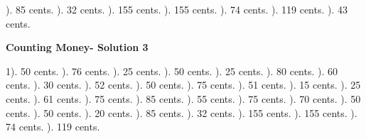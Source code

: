 \documentclass{article}%
\begin{document}
). 85 cents.%
). 32 cents.%
). 155 cents.%
). 155 cents.%
). 74 cents.%
). 119 cents.%
). 43 cents.%
\newline%
\newpage%
\large%
\begin{center}%
\textbf{Counting Money- Solution 3}%
\newline%
\end{center} \normalsize%
1). 50 cents.%
). 76 cents.%
). 25 cents.%
). 50 cents.%
). 25 cents.%
). 80 cents.%
). 60 cents.%
). 30 cents.%
). 52 cents.%
). 50 cents.%
). 75 cents.%
). 51 cents.%
). 15 cents.%
). 25 cents.%
). 61 cents.%
). 75 cents.%
). 85 cents.%
). 55 cents.%
). 75 cents.%
). 70 cents.%
). 50 cents.%
). 50 cents.%
). 20 cents.%
). 85 cents.%
). 32 cents.%
). 155 cents.%
). 155 cents.%
). 74 cents.%
). 119 cents.%
\end{document}
